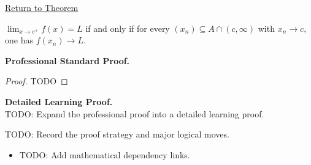 \newpage
{}
\label{prf:sequential-criterion-right-hand-limit}

\begin{remark*}[Return]
\hyperref[thm:sequential-criterion-right-limits]{Return to Theorem}
\end{remark*}

\begin{theorem*}
$\lim_{x\to c^+}f(x)=L$ if and only if for every $(x_n)\subseteq A\cap(c,\infty)$ with $x_n\to c$, one has $f(x_n)\to L$.
\end{theorem*}

\textbf{Professional Standard Proof.}~\\
\begin{proof}
TODO
\end{proof}

\textbf{Detailed Learning Proof.}~\\
TODO: Expand the professional proof into a detailed learning proof.

\begin{remark*}
TODO: Record the proof strategy and major logical moves.
\end{remark*}

\begin{dependencies}
\begin{itemize}
  \item TODO: Add mathematical dependency links.
\end{itemize}
\end{dependencies}
